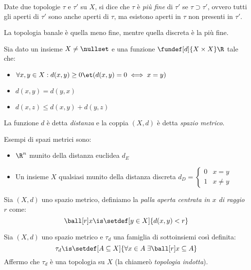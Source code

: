 \begin{defn}[Finezza]
	Date due topologie $\tau$ e $\tau'$ su $X$,
	si dice che $\tau$ è \emph{più fine} di $\tau'$ se $\tau\supset\tau'$,
	ovvero tutti gli aperti di $\tau'$ sono anche aperti di $\tau$,
	ma esistono aperti in $\tau$ non presenti in $\tau'$.
\end{defn}

\begin{oss}
	La topologia banale è quella meno fine, mentre quella discreta è la più fine.
\end{oss}


\begin{defn}
	Sia dato un insieme $X\neq\nullset$ e una funzione $\fundef[d]{X \times X}\R$ tale che:
	\begin{itemize}
		\item $\forall x,y \in X:  d(x,y)\ge0 \et (d(x,y)=0 \iff x=y)$
		\item $d(x,y) = d(y,x)$
		\item $d(x,z) \le d(x,y) + d(y,z)$
	\end{itemize}
	La funzione $d$ è detta \emph{distanza} e la coppia $(X,d)$ è detta \emph{spazio metrico}.
\end{defn}

\begin{es}
	\label{es:spazimetrici}
	Esempi di spazi metrici sono:
	\begin{itemize}
		\item $\R^n$ munito della distanza euclidea $d_E$
		\item Un insieme $X$ qualsiasi munito della distanza discreta
		$d_D= \begin{cases} 0 & x=y \\ 1 & x \neq y \end{cases}$
	\end{itemize}
\end{es}

\begin{defn}
	Sia $(X,d)$ uno spazio metrico,
	definiamo la \emph{palla aperta centrata in $x$ di raggio $r$} come:
	\[\ball[r]x \is \setdef[y \in X]{d(x,y) < r}\]
\end{defn}

\begin{prop}
	Sia $(X, d)$ uno spazio metrico e $\tau_d$ una famiglia di sottoinsiemi così definita:
	\[\tau_d \is \setdef[A \subseteq  X]{\forall x \in A \;\exists \ball[r]x \subseteq A}\]
	Affermo che $\tau_d$ è una topologia su $X$ (la chiamerò \emph{topologia indotta}).
\end{prop}

